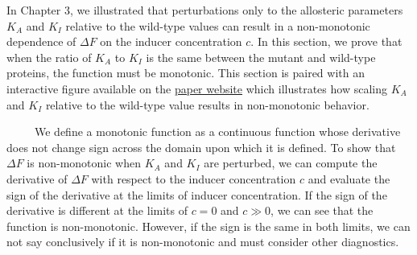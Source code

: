 \documentclass[12pt]{caltech_thesis}
\begin{document}
In Chapter 3, we illustrated that perturbations only to the allosteric
parameters \(K_A\) and \(K_I\) relative to the wild-type values can
result in a non-monotonic dependence of \(\Delta F\) on the inducer
concentration \(c\). In this section, we prove that when the ratio of
\(K_A\) to \(K_I\) is the same between the mutant and wild-type
proteins, the function must be monotonic. This section is paired with an
interactive figure available on the
\href{https://www.rpgroup.caltech.edu/mwc_mutants}{paper website} which
illustrates how scaling \(K_A\) and \(K_I\) relative to the wild-type
value results in non-monotonic behavior.

~~~~~We define a monotonic function as a continuous function whose
derivative does not change sign across the domain upon which it is
defined. To show that \(\Delta F\) is non-monotonic when \(K_A\) and
\(K_I\) are perturbed, we can compute the derivative of \(\Delta F\)
with respect to the inducer concentration \(c\) and evaluate the sign of
the derivative at the limits of inducer concentration. If the sign of
the derivative is different at the limits of \(c = 0\) and \(c \gg 0\),
we can see that the function is non-monotonic. However, if the sign is
the same in both limits, we can not say conclusively if it is
non-monotonic and must consider other diagnostics.
\end{document}
